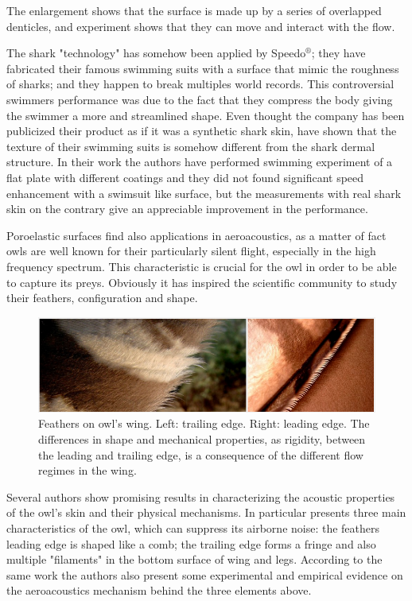 The enlargement shows that the surface is made up by a series of overlapped denticles, and experiment shows that they can move and interact with the flow.

The shark "technology" has somehow been applied by Speedo$^{\circledR}$; they have fabricated their famous swimming suits with a surface that mimic the roughness of sharks; and they happen to break multiples world records.
This controversial swimmers performance was due to the fact that they compress the body giving the swimmer a more and streamlined shape.
Even thought the company has been publicized their product as if it was a synthetic shark skin, \citet{Oeffner785} have shown that the texture of their swimming suits is somehow different from the shark dermal structure.
In their work the authors have performed swimming experiment of a flat plate with different coatings and they did not found significant speed enhancement with a swimsuit like surface, but the measurements with real shark skin on the contrary give an appreciable improvement in the performance.

Poroelastic surfaces find also applications in aeroacoustics, as a matter of fact owls are well known for their particularly silent flight, especially in the high frequency spectrum.
This characteristic is crucial for the owl in order to be able to capture its preys.
Obviously it has inspired the scientific community to study their feathers, configuration and shape.

\begin{figure}[h]
	\centering
	\includegraphics[width=0.8\linewidth]{chapter_1/howl}
	\caption{Feathers on owl's wing. Left: trailing edge. Right: leading edge. The differences in shape and mechanical properties, as rigidity, between the leading and trailing edge, is a consequence of the different flow regimes in the wing.}
	\label{fig:owl}
\end{figure}
 
Several authors show promising results in characterizing the acoustic properties of the owl's skin and their physical mechanisms.
In particular \citet{lilley1998} presents three main characteristics of the owl, which can suppress its airborne noise: the feathers leading edge is shaped like a comb; the trailing edge forms a fringe and also multiple "filaments" in the bottom surface of wing and legs.
According to the same work the authors also present some experimental and empirical evidence on the aeroacoustics mechanism behind the three elements above.


